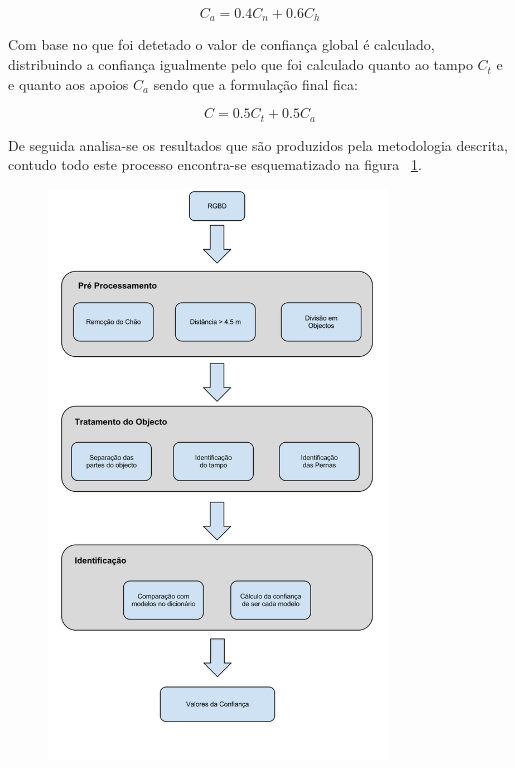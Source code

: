 \begin{equation}\label{eq:ca}
C_a = 0.4C_n + 0.6C_h
\end{equation}


Com base no que foi detetado o valor de confiança global é calculado, distribuindo a confiança igualmente pelo que foi calculado quanto ao tampo \(C_t\) e e quanto aos apoios \(C_a\) sendo que a formulação final fica:

\begin{equation}\label{eq:cfinal}
C = 0.5C_t + 0.5C_a
\end{equation}

De seguida analisa-se os resultados que são produzidos pela metodologia descrita, contudo todo este processo encontra-se esquematizado na figura ~\ref{fig:processamento}.

\begin{figure}[!htb]
	\begin{center}
	\includegraphics[width=0.80\textwidth]{figures/processo_identificacao.png}
		\label{fig:processamento}
	\end{center}
\end{figure}

